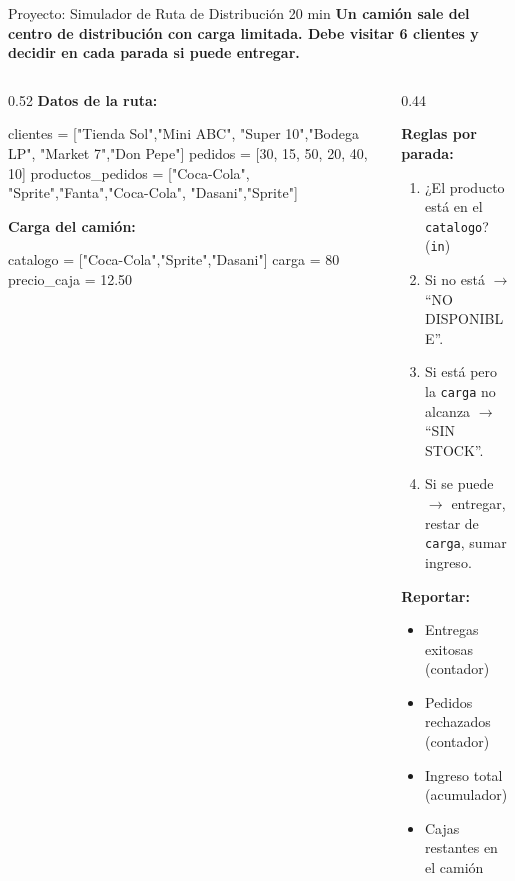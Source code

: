 \documentclass[aspectratio=169, 11pt]{beamer}
\begin{document}
\begin{frame}[fragile,shrink=30]{Proyecto: Simulador de Ruta de Distribución \hfill {\normalsize\color{arcaRed}\faClock\hspace{4pt}20 min}}
  \vspace{-6pt}
  {\small\color{arcaDark}\bfseries
    Un camión sale del centro de distribución con carga limitada.
    Debe visitar 6 clientes y decidir en cada parada si puede entregar.}

  \vspace{4pt}
  \begin{columns}[T]
    \begin{column}{0.52\textwidth}
      {\footnotesize\color{arcaDark}\bfseries Datos de la ruta:}
      \vspace{2pt}
      \begin{pyblock}
clientes  = ["Tienda Sol","Mini ABC",
  "Super 10","Bodega LP",
  "Market 7","Don Pepe"]
pedidos   = [30, 15, 50, 20, 40, 10]
productos_pedidos = ["Coca-Cola",
  "Sprite","Fanta","Coca-Cola",
  "Dasani","Sprite"]
      \end{pyblock}

      \vspace{2pt}
      {\footnotesize\color{arcaDark}\bfseries Carga del camión:}
      \vspace{2pt}
      \begin{pyblock}
catalogo = ["Coca-Cola","Sprite","Dasani"]
carga = 80
precio_caja = 12.50
      \end{pyblock}
    \end{column}

    \begin{column}{0.44\textwidth}
      {\footnotesize\color{textMuted}
        \textbf{Reglas por parada:}
        \begin{enumerate}\setlength{\itemsep}{2pt}
          \item ¿El producto está en el
            \texttt{catalogo}? (\texttt{in})
          \item Si no está $\rightarrow$ ``NO DISPONIBLE''.
          \item Si está pero la \texttt{carga} no
            alcanza $\rightarrow$ ``SIN STOCK''.
          \item Si se puede $\rightarrow$ entregar,
            restar de \texttt{carga}, sumar ingreso.
        \end{enumerate}

        \vspace{4pt}
        \textbf{Reportar:}
        \begin{itemize}\setlength{\itemsep}{1pt}
          \item Entregas exitosas (contador)
          \item Pedidos rechazados (contador)
          \item Ingreso total (acumulador)
          \item Cajas restantes en el camión
        \end{itemize}
      }
    \end{column}
  \end{columns}
\end{frame}
\end{document}
